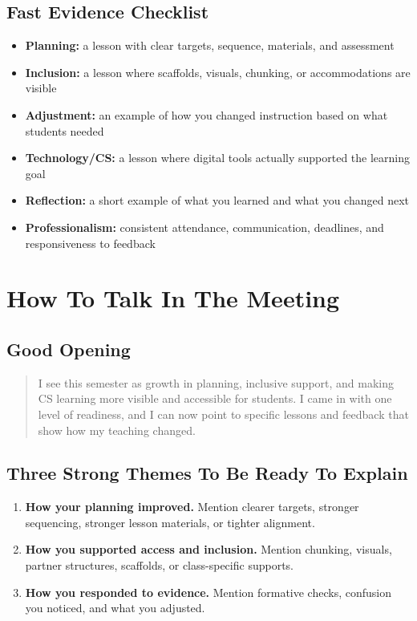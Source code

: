 \documentclass[11pt]{article}
\begin{document}
\subsection{Fast Evidence Checklist}

\begin{itemize}[leftmargin=*]
  \item \textbf{Planning:} a lesson with clear targets, sequence, materials, and assessment
  \item \textbf{Inclusion:} a lesson where scaffolds, visuals, chunking, or accommodations are visible
  \item \textbf{Adjustment:} an example of how you changed instruction based on what students needed
  \item \textbf{Technology/CS:} a lesson where digital tools actually supported the learning goal
  \item \textbf{Reflection:} a short example of what you learned and what you changed next
  \item \textbf{Professionalism:} consistent attendance, communication, deadlines, and responsiveness to feedback
\end{itemize}

\section{How To Talk In The Meeting}

\subsection{Good Opening}

\begin{quote}
I see this semester as growth in planning, inclusive support, and making CS learning more visible and accessible for students. I came in with one level of readiness, and I can now point to specific lessons and feedback that show how my teaching changed.
\end{quote}

\subsection{Three Strong Themes To Be Ready To Explain}

\begin{enumerate}[leftmargin=*]
  \item \textbf{How your planning improved.}
  Mention clearer targets, stronger sequencing, stronger lesson materials, or tighter alignment.
  \item \textbf{How you supported access and inclusion.}
  Mention chunking, visuals, partner structures, scaffolds, or class-specific supports.
  \item \textbf{How you responded to evidence.}
  Mention formative checks, confusion you noticed, and what you adjusted.
\end{enumerate}
\end{document}
